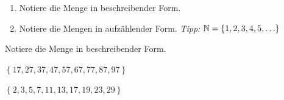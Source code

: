 \documentclass[11pt,oneside]{article}
\begin{document}
    \begin{aufgabe}
    	\begin{enumerate}
            \item Notiere die Menge in beschreibender Form.
    		\item Notiere die Mengen in aufzählender Form. \textit{Tipp: $\mathbb{N}=\left\{1,2,3,4,5,\ldots\right\}$}
    	\end{enumerate}
    \end{aufgabe}
    \begin{aufgabe}
    	Notiere die Menge in beschreibender Form.
    	\begin{enumcols}[2]
    		\item $\left\{17,27,37,47,57,67,77,87,97\right\}$
    		\item $\left\{2,3,5,7,11,13,17,19,23,29\right\}$
    	\end{enumcols}
    \end{aufgabe}
\end{document}
